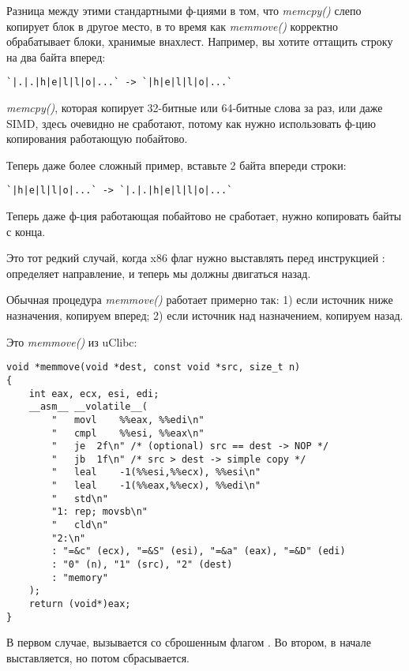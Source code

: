 \label{memmove_and_DF}

Разница между этими стандартными ф-циями в том, что 
\emph{memcpy()} слепо копирует блок в другое место,
в то время как \emph{memmove()} корректно обрабатывает блоки, хранимые внахлест.
Например, вы хотите оттащить строку на два байта вперед:

\begin{lstlisting}
`|.|.|h|e|l|l|o|...` -> `|h|e|l|l|o|...`
\end{lstlisting}

\emph{memcpy()}, которая копирует 32-битные или 64-битные слова за раз, или даже \ac{SIMD},
здесь очевидно не сработают, потому как нужно использовать ф-цию копирования работающую побайтово.

Теперь даже более сложный пример, вставьте 2 байта впереди строки:

\begin{lstlisting}
`|h|e|l|l|o|...` -> `|.|.|h|e|l|l|o|...`
\end{lstlisting}

Теперь даже ф-ция работающая побайтово не сработает, нужно копировать байты с конца.

Это тот редкий случай, когда x86 флаг  нужно выставлять перед инструкцией :
 определяет направление, и теперь мы должны двигаться назад.

Обычная процедура \emph{memmove()} работает примерно так:
1) если источник ниже назначения, копируем вперед;
2) если источник над назначением, копируем назад.

Это \emph{memmove()} из uClibc:

\begin{lstlisting}[style=customc]
void *memmove(void *dest, const void *src, size_t n)
{
	int eax, ecx, esi, edi;
	__asm__ __volatile__(
		"	movl	%%eax, %%edi\n"
		"	cmpl	%%esi, %%eax\n"
		"	je	2f\n" /* (optional) src == dest -> NOP */
		"	jb	1f\n" /* src > dest -> simple copy */
		"	leal	-1(%%esi,%%ecx), %%esi\n"
		"	leal	-1(%%eax,%%ecx), %%edi\n"
		"	std\n"
		"1:	rep; movsb\n"
		"	cld\n"
		"2:\n"
		: "=&c" (ecx), "=&S" (esi), "=&a" (eax), "=&D" (edi)
		: "0" (n), "1" (src), "2" (dest)
		: "memory"
	);
	return (void*)eax;
}
\end{lstlisting}

В первом случае,  вызывается со сброшенным флагом .
Во втором,  в начале выставляется, но потом сбрасывается.

